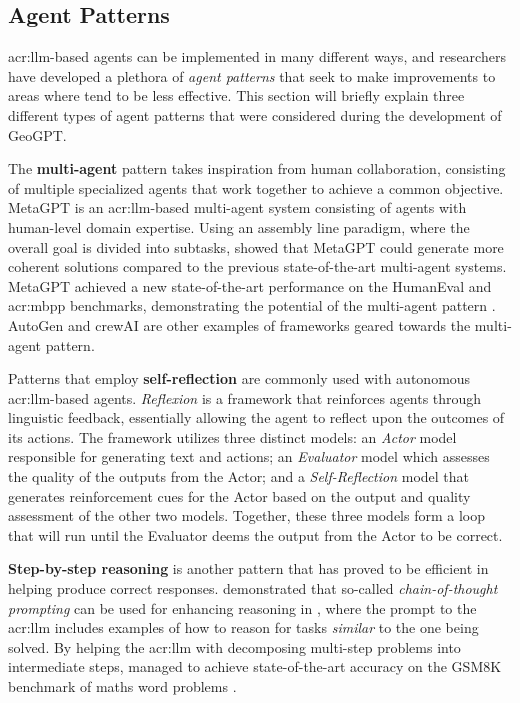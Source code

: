 \subsection{Agent Patterns}
\label{subsec:agent-patterns}

\acrshort{acr:llm}-based agents can be implemented in many different ways, and researchers have developed a plethora of \textit{agent patterns} that seek to make improvements to areas where  tend to be less effective. This section will briefly explain three different types of agent patterns that were considered during the development of GeoGPT.

The \textbf{multi-agent} pattern takes inspiration from human collaboration, consisting of multiple specialized agents that work together to achieve a common objective. MetaGPT \citep{hongMetaGPTMetaProgramming2023} is an \acrshort{acr:llm}-based multi-agent system consisting of agents with human-level domain expertise. Using an assembly line paradigm, where the overall goal is divided into subtasks, \citeauthor{hongMetaGPTMetaProgramming2023} showed that MetaGPT could generate more coherent solutions compared to the previous state-of-the-art multi-agent systems. MetaGPT achieved a new state-of-the-art performance on the HumanEval \citep{chanChatEvalBetterLLMbased2023} and \gls{acr:mbpp} \citep{austinProgramSynthesisLarge2021} benchmarks, demonstrating the potential of the multi-agent pattern \citep[7]{hongMetaGPTMetaProgramming2023}. AutoGen \citep{wuAutoGenEnablingNextGen2023a} and crewAI \citep{mouraJoaomdmouraCrewAI2024} are other examples of frameworks geared towards the multi-agent pattern.

Patterns that employ \textbf{self-reflection} are commonly used with autonomous \acrshort{acr:llm}-based agents. \textit{Reflexion} \citep{shinnReflexionLanguageAgents2023} is a framework that reinforces agents through linguistic feedback, essentially allowing the agent to reflect upon the outcomes of its actions. The framework utilizes three distinct models: an \textit{Actor} model responsible for generating text and actions; an \textit{Evaluator} model which assesses the quality of the outputs from the Actor; and a \textit{Self-Reflection} model that generates reinforcement cues for the Actor based on the output and quality assessment of the other two models. Together, these three models form a loop that will run until the Evaluator deems the output from the Actor to be correct.

\textbf{Step-by-step reasoning} is another pattern that has proved to be efficient in helping  produce correct responses. \cite{weiChainofThoughtPromptingElicits2023a} demonstrated that so-called \textit{chain-of-thought prompting} can be used for enhancing reasoning in , where the prompt to the \acrshort{acr:llm} includes examples of how to reason for tasks \textit{similar} to the one being solved. By helping the \acrshort{acr:llm} with decomposing multi-step problems into intermediate steps, \citeauthor{weiChainofThoughtPromptingElicits2023a} managed to achieve state-of-the-art accuracy on the GSM8K benchmark of maths word problems \citep{cobbeTrainingVerifiersSolve2021}.


\glsresetall
